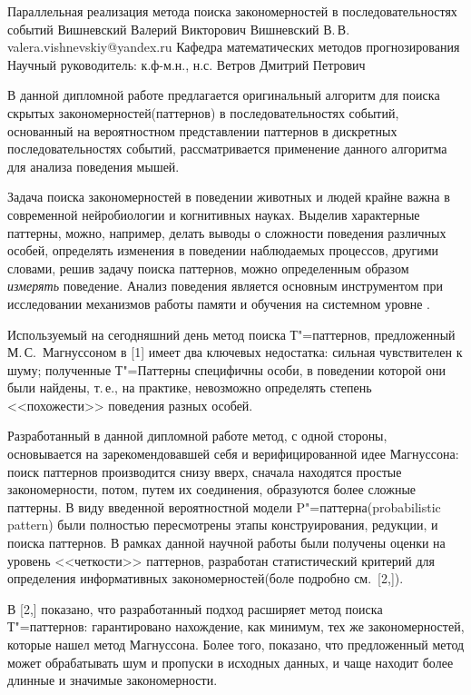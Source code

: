 \Title%
{Параллельная реализация метода поиска закономерностей в последовательностях событий}%
{Вишневский Валерий Викторович}%
{Вишневский В.\,В.}%
{valera.vishnevskiy@yandex.ru}%
{Кафедра математических методов прогнозирования}%
{Научный руководитель:  к.ф-м.н., н.с. Ветров Дмитрий Петрович}

В данной дипломной работе предлагается оригинальный алгоритм для поиска 
скрытых закономерностей(паттернов) в последовательностях событий,
основанный на вероятностном представлении паттернов в дискретных 
последовательностях событий, рассматривается применение данного 
алгоритма для анализа поведения мышей. 

Задача поиска закономерностей в поведении животных и людей 
крайне важна в современной нейробиологии и когнитивных науках. 
Выделив характерные паттерны, можно, например, делать выводы
о сложности поведения различных особей, определять изменения в поведении 
наблюдаемых процессов, другими словами, решив задачу поиска паттернов, 
можно определенным образом {\em измерять} поведение.
Анализ поведения является основным инструментом при исследовании 
механизмов работы памяти и обучения на системном уровне .

Используемый на сегодняшний день метод поиска Т"=паттернов, предложенный 
М.\,С.~Магнуссоном в [1] имеет два ключевых недостатка: сильная чувствителен к шуму;
полученные Т"=Паттерны специфичны особи, в поведении которой они были найдены, т.\,е., на 
практике, невозможно определять степень <<похожести>> поведения разных особей.

Разработанный в данной дипломной работе метод, с одной стороны, 
основывается на зарекомендовавшей себя и верифицированной идее Магнуссона: 
поиск паттернов производится снизу вверх, сначала 
находятся простые закономерности, потом, путем их соединения, образуются 
более сложные паттерны. 
В виду введенной вероятностной модели P"=паттерна(probabilistic pattern) 
были полностью пересмотрены этапы конструирования, редукции, и поиска паттернов.
В рамках данной научной работы были получены оценки на уровень <<четкости>>
паттернов, разработан статистический критерий для определения информативных
закономерностей(боле подробно см.~[2,]).

В [2,] показано, что разработанный подход расширяет метод поиска Т"=паттернов:
гарантировано нахождение, как минимум, тех же закономерностей, которые нашел 
метод Магнуссона. 
Более того, показано, что предложенный метод может обрабатывать шум и пропуски
в исходных данных, и чаще находит более длинные и значимые закономерности. 

